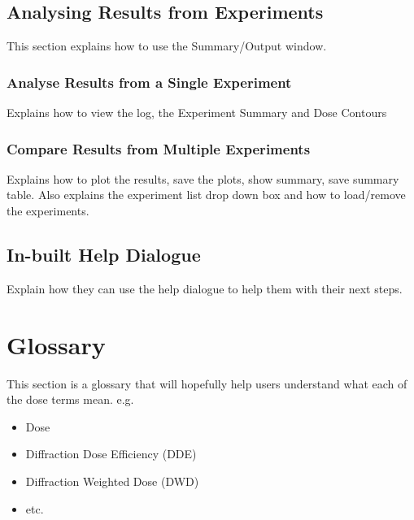 \documentclass[a4paper]{article}
\begin{document}
\subsection{Analysing Results from Experiments}
This section explains how to use the Summary/Output window.

\subsubsection{Analyse Results from a Single Experiment}
Explains how to view the log, the Experiment Summary and Dose Contours

\subsubsection{Compare Results from Multiple Experiments}
Explains how to plot the results, save the plots, show summary, save summary table. Also explains the experiment list drop down box and how to load/remove the experiments.

\subsection{In-built Help Dialogue}
Explain how they can use the help dialogue to help them with their next steps.

\section{Glossary}
This section is a glossary that will hopefully help users understand what each of the dose terms mean. e.g.
\begin{itemize}
\item Dose
\item Diffraction Dose Efficiency (DDE)
\item Diffraction Weighted Dose (DWD)
\item etc.
\end{itemize}
\end{document}
